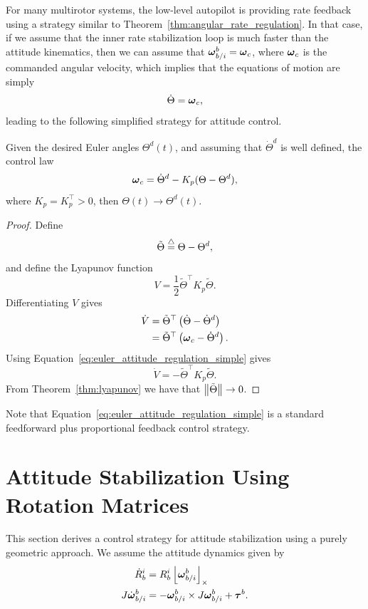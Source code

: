 For many multirotor systems, the low-level autopilot is providing rate feedback using a strategy similar to Theorem~\ref{thm:angular_rate_regulation}.  In that case, if we assume that the inner rate stabilization loop is much faster than the attitude kinematics, then we can assume that $\boldsymbol{\omega}_{b/i}^b = \boldsymbol{\omega}_c$, where $\boldsymbol{\omega}_c$ is the commanded angular velocity, which implies that the equations of motion are simply
\[
\dot{\Theta} = \boldsymbol{\omega}_c,
\]
leading to the following simplified strategy for attitude control.
\begin{theorem}\label{thm:euler_attitude_stabilization_simple}
	Given the desired Euler angles $\Theta^d(t)$, and assuming that $\dot{\Theta}^d$ is well defined, the control law
	\begin{equation}\label{eq:euler_attitude_regulation_simple}
	\omegabf_c = \dot{\Theta}^d - K_p (\Theta-\Theta^d),
	\end{equation}
	where $K_p=K_p^\top >0$, then $\Theta(t)\to\Theta^d(t)$.
\end{theorem}
\begin{proof}
Define
\[
\tilde{\Theta} \stackrel{\triangle}{=} \Theta - \Theta^d,
\]
and define the Lyapunov function
\[
V = \frac{1}{2}\tilde{\Theta}^\top K_p \tilde{\Theta}.
\]
Differentiating $V$ gives
\begin{align*}
\dot{V} &= \tilde{\Theta}^\top \left(\dot{\Theta} - \dot{\Theta}^d\right) \\
	&= \tilde{\Theta}^\top \left(\boldsymbol{\omega}_c - \dot{\Theta}^d\right).
\end{align*}
Using Equation~\eqref{eq:euler_attitude_regulation_simple} gives
\[
\dot{V} = -\tilde{\Theta}^\top K_p \tilde{\Theta}.
\]
From Theorem~\ref{thm:lyapunov} we have that $\left\|\tilde{\Theta}\right\|\to 0$.
\end{proof}

Note that Equation~\eqref{eq:euler_attitude_regulation_simple} is a standard feedforward plus proportional feedback control strategy.

\section{Attitude Stabilization Using Rotation Matrices}

This section derives a control strategy for attitude stabilization using a purely geometric approach. We assume the attitude dynamics given by
\begin{align}
\dot{R}_b^i &= R_b^i\left\lfloor\boldsymbol{\omega}_{b/i}^b\right\rfloor_{\times} \\
J\dot{\boldsymbol{\omega}}_{b/i}^b &= -\boldsymbol{\omega}_{b/i}^b \times J\boldsymbol{\omega}_{b/i}^b + \boldsymbol{\tau}^b.
\end{align}


